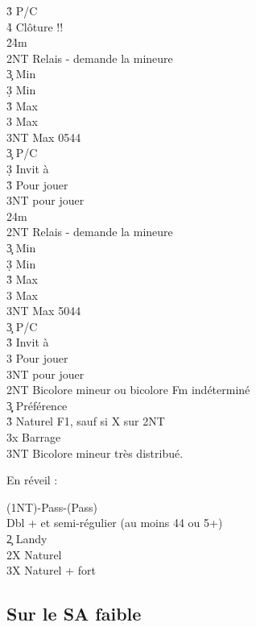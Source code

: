 \documentclass[a4paper]{article}
\begin{document}
\begin{bidtable}
3\h\s \> P/C\\
4\h\s \> Clôture !!\-\\
2\h {}\h 4m\+\\
2NT \> Relais - demande la mineure\+\\
3\c \> Min \c \\
3\d \> Min \d \\
3\h \> Max \c \\
3\s \> Max \d \\
3NT \> Max 0544\-\\
3\c \> P/C\\
3\d \> Invit à \h \\
3\h \> Pour jouer\\
3NT \> pour jouer\-\\
2\s {}\s 4m\+\\
2NT \> Relais - demande la mineure\+\\
3\c \> Min \c \\
3\d \> Min \d \\
3\h \> Max \c \\
3\s \> Max \d \\
3NT \> Max 5044\-\\
3\c \> P/C\\
3\h \> Invit à \s \\
3\s \> Pour jouer\\
3NT \> pour jouer\-\\
2NT \> Bicolore mineur ou bicolore Fm indéterminé\+\\
3\c\d \> Préférence\\
3\h\s \> Naturel F1, sauf si X sur 2NT\-\\
3x \> Barrage\\
3NT \> Bicolore mineur très distribué.\-
\end{bidtable}

En réveil :

\begin{bidtable}
(1NT)-Pass-(Pass)\+\\
Dbl + et semi-régulier (au moins 44 ou 5+)\\
2\c \> Landy\\
2X \> Naturel\\
3X \> Naturel + fort\-
\end{bidtable}

\subsection{Sur le SA faible}
\end{document}
